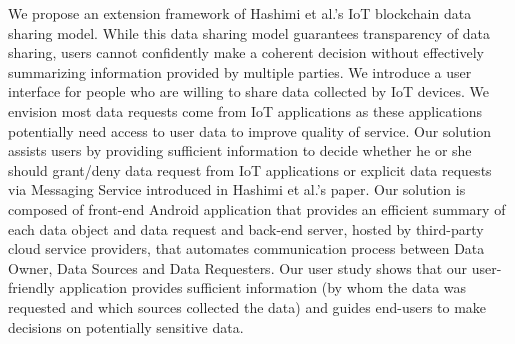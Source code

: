 We propose an extension framework of Hashimi et al.'s \cite{campbell} IoT blockchain data sharing model. While this data sharing model guarantees transparency of data sharing, users cannot confidently make a coherent decision without effectively summarizing information provided by multiple parties. We introduce a user interface for people who are willing to share data collected by IoT devices. We envision most data requests come from IoT applications as these applications potentially need access to user data to improve quality of service. Our solution assists users by providing sufficient information to decide whether he or she should grant/deny data request from IoT applications or explicit data requests via Messaging Service introduced in Hashimi et al.'s paper. Our solution is composed of front-end Android application that provides an efficient summary of each data object and data request and back-end server, hosted by third-party cloud service providers, that automates communication process between Data Owner, Data Sources and Data Requesters. Our user study shows that our user-friendly application provides sufficient information (by whom the data was requested and which sources collected the data) and guides end-users to make decisions on potentially sensitive data. 